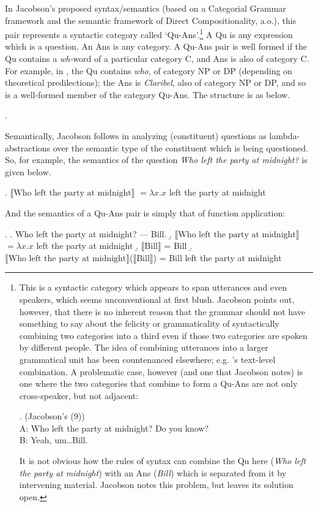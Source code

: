 \documentclass[doublespace]{umthesis}
\newcommand{\ext}[1]{\ensuremath{\llbracket \textrm{{#1}} \rrbracket}}
\begin{document}
In Jacobson's proposed syntax/semantics (based on a Categorial Grammar framework and the semantic framework of Direct Compositionality, \cite{BJ07} a.o.), this pair represents a syntactic category called `Qu-Ans'.\footnote{This is a syntactic category which appears to span utterances and even speakers, which seems unconventional at first blush. Jacobson points out, however, that there is no inherent reason that the grammar should not have something to say about the felicity or grammaticality of syntactically combining two categories into a third even if those two categories are spoken by different people. The idea of combining utterances into a larger grammatical unit has been countenanced elsewhere; e.g. \cite{Hei82}'s text-level combination. A problematic case, however (and one that Jacobson notes) is one where the two categories that combine to form a Qu-Ans are not only cross-speaker, but not adjacent:

\ex. 	(Jacobson's (9))\\
	A: Who left the party at midnight? Do you know?\\
	B: Yeah, um\ldots Bill.
	
It is not obvious how the rules of syntax can combine the Qu here ({\it Who left the party at midnight}) with an Ans ({\it Bill}) which is separated from it by intervening material. Jacobson notes this problem, but leaves its solution open.} A Qu is any expression which is a question. An Ans is any category. A Qu-Ans pair is well formed if the Qu contains a {\it wh-}word of a particular category C, and Ans is also of category C. For example, in \Last, the Qu contains {\it who}, of category NP or DP (depending on theoretical predilections); the Ans is {\it Claribel}, also of category NP or DP, and so \Last is a well-formed member of the category Qu-Ans. The structure is as below.

\ex. 	

Semantically, Jacobson follows \cite{GS00} in analyzing (constituent) questions as lambda-abstractions over the semantic type of the constituent which is being questioned. So, for example, the semantics of the question {\it Who left the party at midnight?} is given below.

\ex. 	\ext{Who left the party at midnight} $= \lambda x. x$ left the party at midnight

And the semantics of a Qu-Ans pair is simply that of function application:

\ex. 	\a. Who left the party at midnight? --- Bill.
	\b. \ext{Who left the party at midnight} $= \lambda x. x$ left the party at midnight
	\b. \ext{Bill} = Bill
	\b. \ext{Who left the party at midnight}(\ext{Bill}) = Bill left the party at midnight
	
\end{document}
